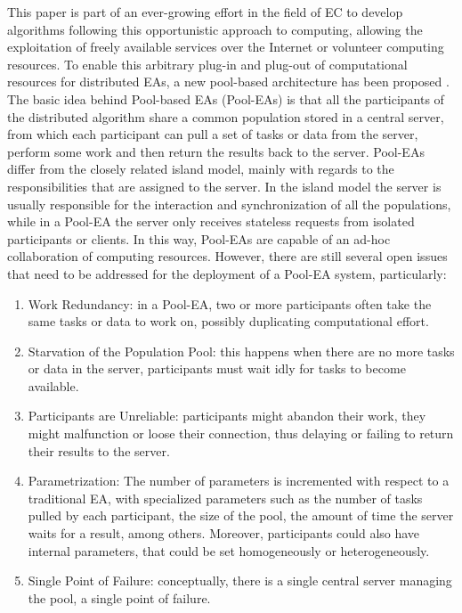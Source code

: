 This paper is part of an ever-growing effort in the field of EC to develop algorithms following this opportunistic approach to computing, allowing the exploitation of freely available services over the Internet or volunteer computing resources. To enable this arbitrary plug-in and plug-out of computational resources for distributed EAs, a new pool-based architecture has been proposed \cite{sofea1,sofea2,sofea3,PoolvsIsland,Evospace,Musart,FreeLunch,Fire}.
The basic idea behind Pool-based EAs (Pool-EAs) is that all the participants of the distributed algorithm share a common population stored in a central server, from which each participant can pull a set of tasks or data from the server, perform some work and then return the results back to the server. Pool-EAs differ from the closely related island model, mainly with regards to the responsibilities that are assigned to the server.
In the island model the server is usually responsible for the interaction and synchronization of all the populations,
while in a Pool-EA the server only receives stateless requests from isolated participants or clients. 
In this way, Pool-EAs are capable of an ad-hoc collaboration of computing resources.
However, there are still several open issues that need to be addressed for the deployment of a Pool-EA system, particularly:
\begin{enumerate}
	\item Work Redundancy: in a Pool-EA, two or more participants often take the same tasks or data to work on, possibly duplicating
	computational effort.
	\item Starvation of the Population Pool: this happens when there are no more tasks or data in the server, participants must wait idly for tasks to become available.
	  
	
	\item Participants are Unreliable: participants might abandon their work, they might malfunction or loose their connection, thus delaying or failing to return their results to the server.
	\item Parametrization: The number of parameters is incremented with respect to a traditional EA, with specialized parameters such as the number of tasks pulled by each participant, the size of the pool, the amount of time the server waits for a result, among others. Moreover, participants could also have internal parameters, that could be set homogeneously or heterogeneously.
	\item Single Point of Failure: conceptually, there is a single central server managing the pool, a single point of failure.  	
\end{enumerate}
        
